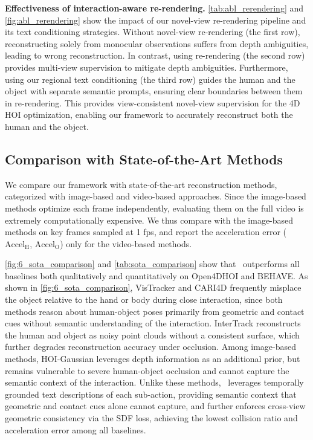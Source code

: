 \noindent\textbf{Effectiveness of interaction-aware re-rendering.}
\cref{tab:abl_rerendering} and \cref{fig:abl_rerendering} show the impact of our novel-view re-rendering pipeline and its text conditioning strategies.
Without novel-view re-rendering (the first row), reconstructing solely from monocular observations suffers from depth ambiguities, leading to wrong reconstruction.
In contrast, using re-rendering (the second row) provides multi-view supervision to mitigate depth ambiguities.
Furthermore, using our regional text conditioning (the third row) guides the human and the object with separate semantic prompts, ensuring clear boundaries between them in re-rendering.
This provides view-consistent novel-view supervision for the 4D HOI optimization, enabling our framework to accurately reconstruct both the human and the object.



\subsection{Comparison with State-of-the-Art Methods}
We compare our framework with state-of-the-art reconstruction methods, categorized with image-based and video-based approaches.
Since the image-based methods optimize each frame independently, evaluating them on the full video is extremely computationally expensive.
We thus compare with the image-based methods on key frames sampled at 1 fps, and report the acceleration error ($\text{Accel}_{\text{H}}$, $\text{Accel}_{\text{O}}$) only for the video-based methods.






\cref{fig:6_sota_comparison} and \cref{tab:sota_comparison} show that \ourmethod~outperforms all baselines both qualitatively and quantitatively on Open4DHOI and BEHAVE.
As shown in \cref{fig:6_sota_comparison}, VisTracker and CARI4D frequently misplace the object relative to the hand or body during close interaction, since both methods reason about human-object poses primarily from geometric and contact cues without semantic understanding of the interaction.
InterTrack reconstructs the human and object as noisy point clouds without a consistent surface, which further degrades reconstruction accuracy under occlusion.
Among image-based methods, HOI-Gaussian leverages depth information as an additional prior, but remains vulnerable to severe human-object occlusion and cannot capture the semantic context of the interaction.
Unlike these methods, \ourmethod~leverages temporally grounded text descriptions of each sub-action, providing semantic context that geometric and contact cues alone cannot capture, and further enforces cross-view geometric consistency via the SDF loss, achieving the lowest collision ratio and acceleration error among all baselines.
